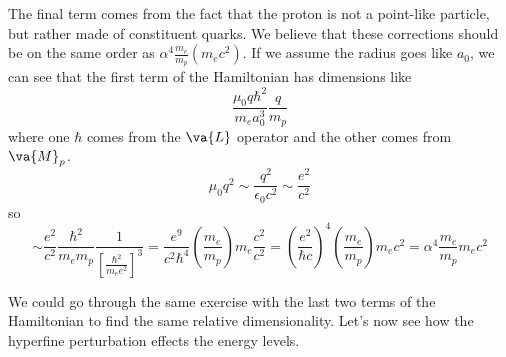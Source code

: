 \documentclass[a4paper,twoside,master.tex]{subfiles}
\begin{document}
The final term comes from the fact that the proton is not a point-like particle, but rather made of constituent quarks. We believe that these corrections should be on the same order as $ \alpha^4 \frac{m_e}{m_p} (m_e c^2) $. If we assume the radius goes like $ a_0 $, we can see that the first term of the Hamiltonian has dimensions like
\begin{equation}
    \frac{\mu_0 q \hbar^2}{m_e a_0^3} \frac{q}{m_p}
\end{equation}
where one $ \hbar $ comes from the $ \va{L} $ operator and the other comes from $ \va{M}_p $.
\begin{equation}
    \mu_0 q^2  \sim \frac{q^2}{\epsilon_0 c^2} \sim \frac{e^2}{c^2}
\end{equation}
so
\begin{equation}
    \sim \frac{e^2}{c^2} \frac{\hbar^2}{m_e m_p} \frac{1}{\left[ \frac{\hbar^2}{m_e e^2} \right]^3} = \frac{e^9}{c^2 \hbar^4} \left( \frac{m_e}{m_p} \right) m_e \frac{c^2}{c^2} = \left( \frac{e^2}{\hbar c} \right)^4 \left( \frac{m_e}{m_p} \right) m_e c^2 = \alpha^4 \frac{m_e}{m_p} m_e c^2
\end{equation}

We could go through the same exercise with the last two terms of the Hamiltonian to find the same relative dimensionality. Let's now see how the hyperfine perturbation effects the energy levels.
\end{document}
